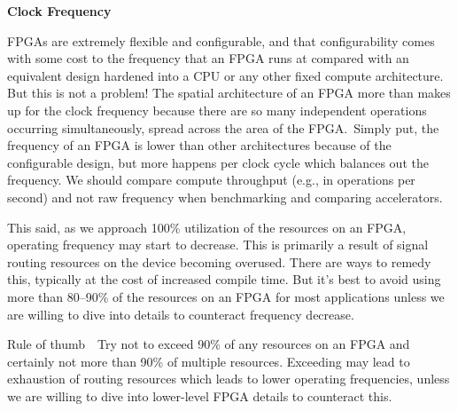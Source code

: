 \hspace*{\fill} \par %
\textbf{Clock Frequency}

FPGAs are extremely flexible and configurable, and that configurability comes with some cost to the frequency that an FPGA runs at compared with an equivalent design hardened into a CPU or any other fixed compute architecture. But this is not a problem! The spatial architecture of an FPGA more than makes up for the clock frequency because there are so many independent operations occurring simultaneously, spread across the area of the FPGA. Simply put, the frequency of an FPGA is lower than other architectures because of the configurable design, but more happens per clock cycle which balances out the frequency. We should compare compute throughput (e.g., in operations per second) and not raw frequency when benchmarking and comparing accelerators.\par

This said, as we approach 100\% utilization of the resources on an FPGA, operating frequency may start to decrease. This is primarily a result of signal routing resources on the device becoming overused. There are ways to remedy this, typically at the cost of increased compile time. But it’s best to avoid using more than 80–90\% of the resources on an FPGA for most applications unless we are willing to dive into details to counteract frequency decrease.\par

\begin{tcolorbox}[colback=red!5!white,colframe=red!75!black]
Rule of thumb Try not to exceed 90\% of any resources on an FPGA and certainly not more than 90\% of multiple resources. Exceeding may lead to exhaustion of routing resources which leads to lower operating frequencies, unless we are willing to dive into lower-level FPGA details to counteract this.
\end{tcolorbox}










